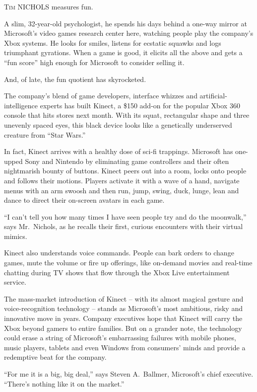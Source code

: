 ﻿\documentclass[12pt]{article}
\begin{document}
\lettrine{T}{im} NICHOLS measures fun.

A slim, 32-year-old psychologist, he spends his days behind a one-way mirror at Microsoft's video
games research center here, watching people play the company's Xbox systems. He looks for smiles,
listens for ecstatic squawks and logs triumphant gyrations. When a game is good, it elicits all the
above and gets a ``fun score'' high enough for Microsoft to consider selling it.

And, of late, the fun quotient has skyrocketed.

The company's blend of game developers, interface whizzes and artificial-intelligence experts has
built Kinect, a \$150 add-on for the popular Xbox 360 console that hits stores next month. With its
squat, rectangular shape and three unevenly spaced eyes, this black device looks like a genetically
underserved creature from ``Star Wars.''

In fact, Kinect arrives with a healthy dose of sci-fi trappings. Microsoft has one-upped Sony and
Nintendo by eliminating game controllers and their often nightmarish bounty of buttons. Kinect peers
out into a room, locks onto people and follows their motions. Players activate it with a wave of a
hand, navigate menus with an arm swoosh and then run, jump, swing, duck, lunge, lean and dance to
direct their on-screen avatars in each game.

``I can't tell you how many times I have seen people try and do the moonwalk,'' says Mr.~Nichols, as
he recalls their first, curious encounters with their virtual mimics.

Kinect also understands voice commands. People can bark orders to change games, mute the volume or
fire up offerings, like on-demand movies and real-time chatting during TV shows that flow through
the Xbox Live entertainment service.

The mass-market introduction of Kinect -- with its almost magical gesture and voice-recognition
technology -- stands as Microsoft's most ambitious, risky and innovative move in years. Company
executives hope that Kinect will carry the Xbox beyond gamers to entire families. But on a grander
note, the technology could erase a string of Microsoft's embarrassing failures with mobile phones,
music players, tablets and even Windows from consumers' minds and provide a redemptive beat for the
company.

``For me it is a big, big deal,'' says Steven A.~Ballmer, Microsoft's chief executive. ``There's
nothing like it on the market.''
\end{document}
